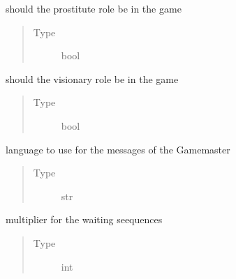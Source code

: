 \documentclass[letterpaper,10pt,english]{sphinxmanual}
\begin{document}
\begin{fulllineitems}
\begin{fulllineitems}
\label{\detokenize{chatwolf:chatwolf.game.Game.prostitute}}
should the prostitute role be in the game
\begin{quote}\begin{description}
\item[{Type}] \leavevmode
bool

\end{description}\end{quote}

\end{fulllineitems}


\begin{fulllineitems}
\label{\detokenize{chatwolf:chatwolf.game.Game.visionary}}
should the visionary role be in the game
\begin{quote}\begin{description}
\item[{Type}] \leavevmode
bool

\end{description}\end{quote}

\end{fulllineitems}


\begin{fulllineitems}
\label{\detokenize{chatwolf:chatwolf.game.Game.lang}}
language to use for the messages of the Game\sphinxhyphen{}master
\begin{quote}\begin{description}
\item[{Type}] \leavevmode
str

\end{description}\end{quote}

\end{fulllineitems}


\begin{fulllineitems}
\label{\detokenize{chatwolf:chatwolf.game.Game.wait_mult}}
multiplier for the waiting seequences
\begin{quote}\begin{description}
\item[{Type}] \leavevmode
int


\end{description}
\end{quote}
\end{fulllineitems}
\end{fulllineitems}
\end{document}

